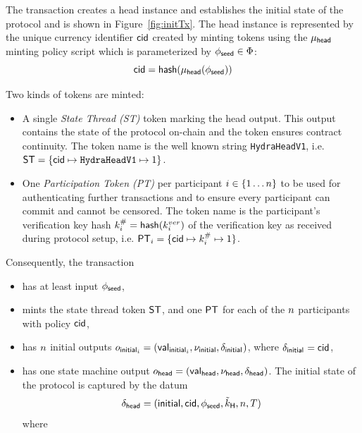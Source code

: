 The \mtxInit{} transaction creates a head instance and establishes the initial
state of the protocol and is shown in Figure~\ref{fig:initTx}. The head
instance is represented by the unique currency identifier $\mathsf{cid}$ created by
minting tokens using the $\mu_\mathsf{head}$ minting policy script which is parameterized
by $\phi_{\mathsf{seed}} \in \Phi$:
\[
	\mathsf{cid} = \mathsf{hash}(\mu_\mathsf{head}(\phi_{\mathsf{seed}}))
\]

\noindent Two kinds of tokens are minted:
\begin{itemize}
	\item A single \emph{State Thread (ST)} token marking the head output. This
	      output contains the state of the protocol on-chain and the token ensures
	      contract continuity. The token name is the well known string
	      \texttt{HydraHeadV1}, i.e.
	      $\mathsf{ST} = \{\mathsf{cid} \mapsto \texttt{HydraHeadV1} \mapsto 1\}$.
	\item One \emph{Participation Token (PT)} per participant
	      $i \in \{1 \dots n \}$ to be used for authenticating further
	      transactions and to ensure every participant can commit and cannot be
	      censored. The token name is the participant's verification key hash
	      $k^{\#}_{i} = \mathsf{hash}(k^{ver}_{i})$ of the verification key as received
	      during protocol setup, i.e.
	      $\mathsf{PT}_{i} = \{\mathsf{cid} \mapsto k^{\#}_{i} \mapsto 1\}$.
\end{itemize}

\noindent Consequently, the \mtxInit{} transaction

\begin{samepage}
	\begin{itemize}
		\item has at least input $\phi_{\mathsf{seed}}$,
		\item mints the state thread token $\mathsf{ST}$, and one $\mathsf{PT}$ for each of the $n$
		      participants with policy $\mathsf{cid}$,
		\item has $n$ initial outputs
		      $o_{\mathsf{initial}_{i}} = (\mathsf{val}_{\mathsf{initial}_{i}}, \nu_{\mathsf{initial}}, \delta_{\mathsf{initial}_{}})$,
		      where $\delta_{\mathsf{initial}_{}} = \mathsf{cid}$,
		\item has one state machine output
		      $o_{\mathsf{head}} = (\mathsf{val}_{\mathsf{head}}, \nu_\mathsf{head}, \delta_{\mathsf{head}})$. The initial state
		      of the protocol is captured by the datum
		      \[
			      \delta_{\mathsf{head}} = (\mathsf{initial},\mathsf{cid},\phi_{\mathsf{seed}},\tilde{k}_{\mathsf{H}},n,T)
		      \]
		      where
	\end{itemize}
\end{samepage}

